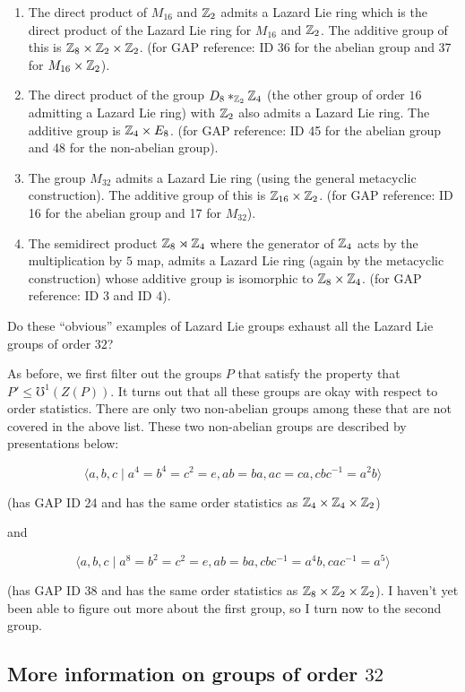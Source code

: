 \documentclass[10pt]{amsart}
\begin{document}
\begin{enumerate}
\item The direct product of $M_{16}$ and $\mathbb{Z}_2$ admits a Lazard Lie
  ring which is the direct product of the Lazard Lie ring for $M_{16}$
  and $\mathbb{Z}_2$. The additive group of this is $\mathbb{Z}_8 \times \mathbb{Z}_2 \times
  \mathbb{Z}_2$. (for GAP reference: ID 36 for the abelian group and 37 for
  $M_{16} \times \mathbb{Z}_2$).
\item The direct product of the group $D_8 *_{\mathbb{Z}_2} \mathbb{Z}_4$ (the other
  group of order $16$ admitting a Lazard Lie ring) with $\mathbb{Z}_2$ also
  admits a Lazard Lie ring. The additive group is $\mathbb{Z}_4 \times
  E_8$. (for GAP reference: ID 45 for the abelian group and 48 for the
  non-abelian group).
\item The group $M_{32}$ admits a Lazard Lie ring (using the general
  metacyclic construction). The additive group of this is $\mathbb{Z}_{16}
  \times \mathbb{Z}_2$. (for GAP reference: ID 16 for the abelian group and 17
  for $M_{32}$).
\item The semidirect product $\mathbb{Z}_8 \rtimes \mathbb{Z}_4$ where the generator
  of $\mathbb{Z}_4$ acts by the multiplication by $5$ map, admits a Lazard Lie
  ring (again by the metacyclic construction) whose additive group is
  isomorphic to $\mathbb{Z}_8 \times \mathbb{Z}_4$. (for GAP reference: ID 3 and ID 4).
\end{enumerate}

Do these ``obvious'' examples of Lazard Lie groups exhaust all the
Lazard Lie groups of order $32$? 

As before, we first filter out the groups $P$ that satisfy the
property that $P' \le \mho^1(Z(P))$. It turns out that all these
groups are okay with respect to order statistics. There are only two
non-abelian groups among these that are not covered in the above
list. These two non-abelian groups are described by presentations
below:

$$\langle a,b,c \mid a^4 = b^4 = c^2 = e, ab = ba, ac = ca, cbc^{-1} = a^2b \rangle$$

(has GAP ID 24 and has the same order statistics as $\mathbb{Z}_4 \times \mathbb{Z}_4
\times \mathbb{Z}_2$)

and

$$\langle a,b,c \mid a^8 = b^2 = c^2 = e, ab = ba, cbc^{-1} = a^4b, cac^{-1} = a^5 \rangle$$

(has GAP ID 38 and has the same order statistics as $\mathbb{Z}_8 \times \mathbb{Z}_2
\times \mathbb{Z}_2$). I haven't yet been able to figure out more about the
first group, so I turn now to the second group.

\subsection{More information on groups of order $32$}
\end{document}
